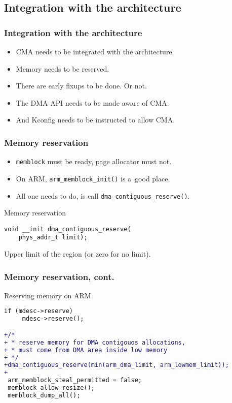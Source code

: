 \subsection{Integration with the architecture}

\begin{frame}
  \frametitle{Integration with the architecture}

  \begin{itemize}
  \item CMA needs to be integrated with the architecture.
  \item Memory needs to be reserved.
  \item There are early fixups to be done. {\footnotesize Or not.}
  \item The DMA API needs to be made aware of CMA.
  \item And Kconfig needs to be instructed to allow CMA.
  \end{itemize}
\end{frame}

\begin{frame}[fragile]
  \frametitle{Memory reservation}

  \begin{itemize}
  \item \lstinline|memblock| must be ready, page allocator must not.
  \item On ARM, \lstinline|arm_memblock_init()| is a~good place.
  \item All one needs to do, is call
    \lstinline|dma_contiguous_reserve()|.
  \end{itemize}

  \begin{block}{Memory reservation}
\begin{lstlisting}
void __init dma_contiguous_reserve(
    phys_addr_t limit);
\end{lstlisting}
  \end{block}

  \begin{description}[limit]
  \item[limit] Upper limit of the region (or zero for no limit).
  \end{description}

\end{frame}

\begin{frame}[fragile]
  \frametitle{Memory reservation, cont.}

  \begin{block}{Reserving memory on ARM}
\begin{lstlisting}[language=diff]
 if (mdesc->reserve)
     mdesc->reserve();

+/*
+ * reserve memory for DMA contigouos allocations,
+ * must come from DMA area inside low memory
+ */
+dma_contiguous_reserve(min(arm_dma_limit, arm_lowmem_limit));
+
 arm_memblock_steal_permitted = false;
 memblock_allow_resize();
 memblock_dump_all();
\end{lstlisting}
  \end{block}
\end{frame}

